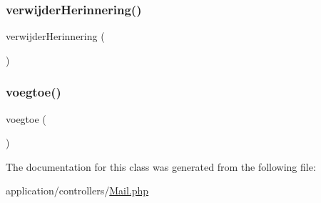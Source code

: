 \mbox{\label{class_mail_af953414894f70a47dcf5986212c7e68d}} 
\subsubsection{\texorpdfstring{verwijder\+Herinnering()}{verwijderHerinnering()}}
{\footnotesize\ttfamily verwijder\+Herinnering (\begin{DoxyParamCaption}{ }\end{DoxyParamCaption})}

\mbox{\label{class_mail_aba42b30d30a5aca661ea48add5edb520}} 
\subsubsection{\texorpdfstring{voegtoe()}{voegtoe()}}
{\footnotesize\ttfamily voegtoe (\begin{DoxyParamCaption}{ }\end{DoxyParamCaption})}



The documentation for this class was generated from the following file\+:\begin{DoxyCompactItemize}
\item 
application/controllers/\mbox{\hyperlink{_mail_8php}{Mail.\+php}}\end{DoxyCompactItemize}
